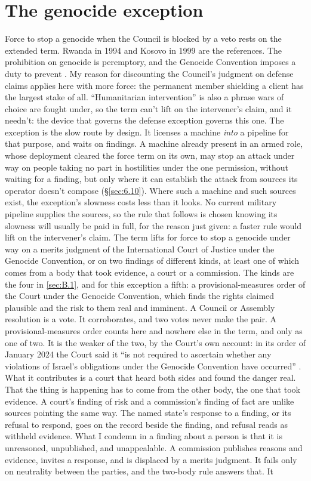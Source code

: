 \section{The genocide exception}
\label{sec:B.4}
Force to stop a genocide when the Council is blocked by a veto rests on the extended term. Rwanda in 1994 and Kosovo in 1999 are the references. The prohibition on genocide is peremptory, and the Genocide Convention imposes a duty to prevent \autocite{icj2007bosnia}. My reason for discounting the Council's judgment on defense claims applies here with more force: the permanent member shielding a client has the largest stake of all. “Humanitarian intervention” is also a phrase wars of choice are fought under, so the term can't lift on the intervener's claim, and it needn't: the device that governs the defense exception governs this one. The exception is the slow route by design. It licenses a machine \emph{into} a pipeline for that purpose, and waits on findings. A machine already present in an armed role, whose deployment cleared the force term on its own, may stop an attack under way on people taking no part in hostilities under the one permission, without waiting for a finding, but only where it can establish the attack from sources its operator doesn't compose (\S\ref{sec:6.10}). Where such a machine and such sources exist, the exception's slowness costs less than it looks. No current military pipeline supplies the sources, so the rule that follows is chosen knowing its slowness will usually be paid in full, for the reason just given: a faster rule would lift on the intervener's claim. The term lifts for force to stop a genocide under way on a merits judgment of the International Court of Justice under the Genocide Convention, or on two findings of different kinds, at least one of which comes from a body that took evidence, a court or a commission. The kinds are the four in \ref{sec:B.1}, and for this exception a fifth: a provisional-measures order of the Court under the Genocide Convention, which finds the rights claimed plausible and the risk to them real and imminent. A Council or Assembly resolution is a vote. It corroborates, and two votes never make the pair. A provisional-measures order counts here and nowhere else in the term, and only as one of two. It is the weaker of the two, by the Court's own account: in its order of January 2024 the Court said it “is not required to ascertain whether any violations of Israel's obligations under the Genocide Convention have occurred” \autocite[para.~30]{icj2024sagenocidepm}. What it contributes is a court that heard both sides and found the danger real. That the thing is happening has to come from the other body, the one that took evidence. A court's finding of risk and a commission's finding of fact are unlike sources pointing the same way. The named state's response to a finding, or its refusal to respond, goes on the record beside the finding, and refusal reads as withheld evidence. What I condemn in a finding about a person is that it is unreasoned, unpublished, and unappealable. A commission publishes reasons and evidence, invites a response, and is displaced by a merits judgment. It fails only on neutrality between the parties, and the two-body rule answers that. It 